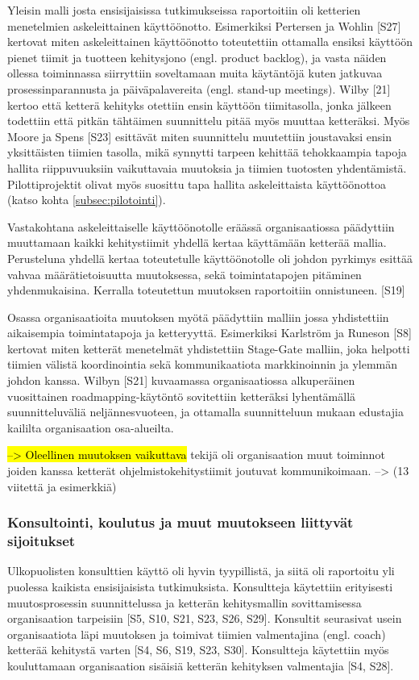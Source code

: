 Yleisin malli josta ensisijaisissa tutkimukseissa raportoitiin oli ketterien
menetelmien askeleittainen käyttöönotto. Esimerkiksi Pertersen ja Wohlin [S27]
kertovat miten askeleittainen käyttöönotto toteutettiin ottamalla ensiksi
käyttöön pienet tiimit ja tuotteen kehitysjono (engl. product backlog), ja vasta
näiden ollessa toiminnassa siirryttiin soveltamaan muita käytäntöjä kuten
jatkuvaa prosessinparannusta ja päiväpalavereita (engl. stand-up meetings).
Wilby [21] kertoo että ketterä kehityks otettiin ensin käyttöön tiimitasolla,
jonka jälkeen todettiin että pitkän tähtäimen suunnittelu pitää myös muuttaa
ketteräksi. Myös Moore ja Spens [S23] esittävät miten suunnittelu muutettiin
joustavaksi ensin yksittäisten tiimien tasolla, mikä synnytti tarpeen kehittää
tehokkaampia tapoja hallita riippuvuuksiin vaikuttavaia muutoksia ja tiimien
tuotosten yhdentämistä. Pilottiprojektit olivat myös suosittu tapa hallita
askeleittaista käyttöönottoa (katso kohta \ref{subsec:pilotointi}).

Vastakohtana askeleittaiselle käyttöönotolle eräässä organisaatiossa päädyttiin
muuttamaan kaikki kehitystiimit yhdellä kertaa käyttämään ketterää mallia.
Perusteluna yhdellä kertaa toteutetulle käyttöönotolle oli johdon pyrkimys
esittää vahvaa määrätietoisuutta muutoksessa, sekä toimintatapojen pitäminen
yhdenmukaisina. Kerralla toteutettun muutoksen raportoitiin onnistuneen. [S19]

Osassa organisaatioita muutoksen myötä päädyttiin malliin jossa yhdistettiin
aikaisempia toimintatapoja ja ketteryyttä. Esimerkiksi Karlström ja Runeson [S8]
kertovat miten ketterät menetelmät yhdistettiin Stage-Gate malliin, joka
helpotti tiimien välistä koordinointia sekä kommunikaatiota markkinoinnin ja
ylemmän johdon kanssa. Wilbyn [S21] kuvaamassa organisaatiossa alkuperäinen
vuosittainen roadmapping-käytöntö sovitettiin ketteräksi lyhentämällä
suunnitteluväliä neljännesvuoteen, ja ottamalla suunnitteluun mukaan edustajia
kaililta organisaation osa-alueilta.

\hl{--> Oleellinen muutoksen vaikuttava} tekijä oli organisaation muut toiminnot
joiden kanssa ketterät ohjelmistokehitystiimit joutuvat kommunikoimaan.
--> (13 viitettä ja esimerkkiä)

\subsubsection{Konsultointi, koulutus ja muut muutokseen liittyvät sijoitukset}

Ulkopuolisten konsulttien käyttö oli hyvin tyypillistä, ja siitä oli raportoitu
yli puolessa kaikista ensisijaisista tutkimuksista. Konsultteja käytettiin
erityisesti muutosprosessin suunnittelussa ja ketterän kehitysmallin
sovittamisessa organisaation tarpeisiin [S5, S10, S21, S23, S26, S29]. Konsultit
seurasivat usein organisaatiota läpi muutoksen ja toimivat tiimien valmentajina
(engl. coach) ketterää kehitystä varten [S4, S6, S19, S23, S30]. Konsultteja
käytettiin myös kouluttamaan organisaation sisäisiä ketterän kehityksen
valmentajia [S4, S28].

